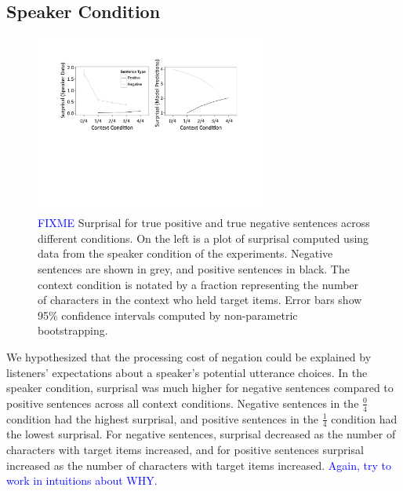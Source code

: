 \documentclass[man, noapacite]{apa2}
\newcommand{\blue}[1]{\textcolor{blue}{#1}}
\begin{document}
\subsection{Speaker Condition}

\begin{figure}[t]
\begin{center} 
\includegraphics[width=3in]{figures/surprisals.pdf}
\caption{\label{fig:e2line} \textcolor{blue}{FIXME} Surprisal for true positive and true negative sentences across different conditions. On the left is a plot of surprisal computed using data from the speaker condition of the experiments.  Negative sentences are shown in grey, and positive sentences in black.  The context condition is notated by a fraction representing the number of characters in the context who held target items. Error bars show 95\% confidence intervals computed by non-parametric bootstrapping.  }
\end{center} 
\end{figure}

We hypothesized that the processing cost of negation could be explained by listeners' expectations about a speaker's potential utterance choices. In the speaker condition, surprisal was much higher for negative sentences compared to positive sentences across all context conditions.  Negative sentences in the $\frac{0}{4}$ condition had the highest surprisal, and positive sentences in the $\frac{1}{4}$ condition had the lowest surprisal.  For negative sentences, surprisal decreased as the number of characters with target items increased, and for positive sentences surprisal increased as the number of characters with target items increased.  \blue{Again, try to work in intuitions about WHY.}

\end{document}
